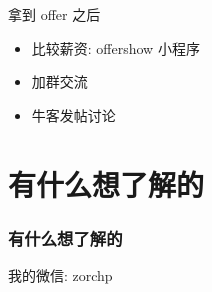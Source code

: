 \documentclass{ctexbeamer}
\begin{document}
\begin{frame}{拿到 offer 之后}
	\begin{itemize}
		\item 比较薪资: offershow 小程序
		\item 加群交流
		\item 牛客发帖讨论
	\end{itemize}
\end{frame}

\section{有什么想了解的}

\begin{frame}
	\frametitle{有什么想了解的}

	我的微信: zorchp
\end{frame}

\begin{frame}{}
	\begin{center}
	\end{center}
\end{frame}
\end{document}
